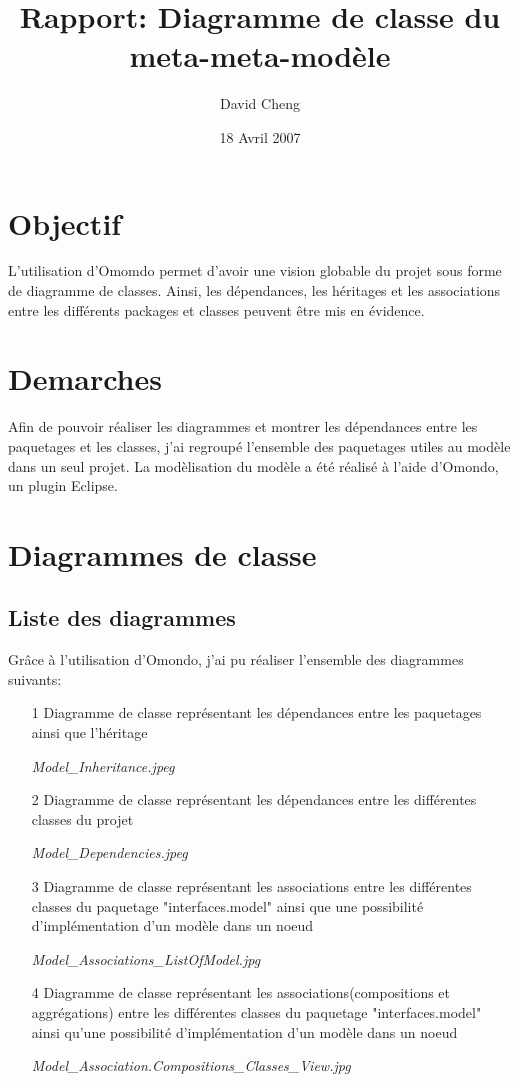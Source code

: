 \documentclass{article}
\title{Rapport: Diagramme de classe du meta-meta-mod\`ele}
\author{David Cheng}
\date{18 Avril 2007}
\begin{document}
\maketitle
\section{Objectif}
\indent
L'utilisation d'Omomdo permet d'avoir une vision globable du projet sous forme de diagramme de classes.
Ainsi, les d\'ependances, les h\'eritages et les associations entre les diff\'erents packages et classes peuvent \^etre mis en \'evidence.

\section{Demarches}
\indent
Afin de pouvoir r\'ealiser les diagrammes et montrer les d\'ependances entre les paquetages et les classes, j'ai regroup\'e l'ensemble des paquetages utiles au mod\`ele dans un seul projet.
La mod\`elisation du mod\`ele a \'et\'e r\'ealis\'e \`a l'aide d'Omondo, un plugin Eclipse.


\section{Diagrammes de classe}
\subsection{Liste des diagrammes}

Gr\^ace \`a l'utilisation d'Omondo, j'ai pu r\'ealiser l'ensemble des diagrammes suivants:

\begin{itemize}
\item[1] Diagramme de classe repr\'esentant les d\'ependances entre les paquetages ainsi que l'h\'eritage

\textit{Model\_Inheritance.jpeg}

\item[2] Diagramme de classe repr\'esentant les d\'ependances entre les diff\'erentes classes du projet

\textit{Model\_Dependencies.jpeg}

\item[3] Diagramme de classe repr\'esentant les associations
entre les diff\'erentes classes du paquetage "interfaces.model"
ainsi que une possibilit\'e d'impl\'ementation d'un mod\`ele dans un noeud

\textit{Model\_Associations\_ListOfModel.jpg}

\item[4] Diagramme de classe repr\'esentant les associations(compositions et aggr\'egations) 
entre les diff\'erentes classes du paquetage "interfaces.model"
ainsi qu'une possibilit\'e d'impl\'ementation d'un mod\`ele dans un noeud

\textit{Model\_Association.Compositions\_Classes\_View.jpg}
\end{itemize}
\end{document}
